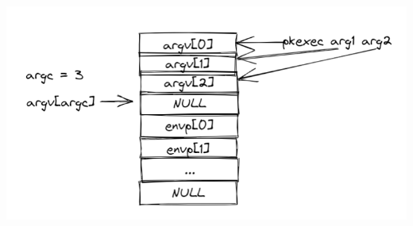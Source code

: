 \documentclass[12pt,a4paper]{article}
\begin{document}
\begin{flushleft}
                \begin{center}
                    \includegraphics[scale=0.6]{main}
                \end{center}
                

\end{flushleft}
\end{document}
